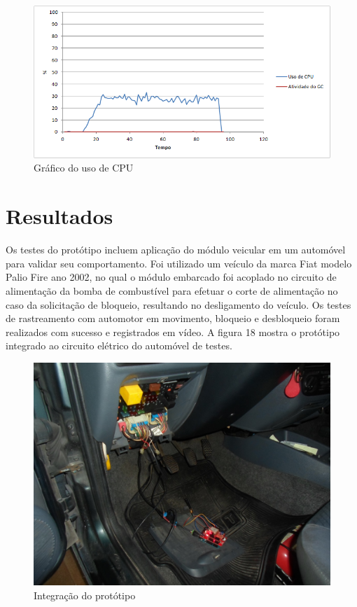 \begin{figure}[!htb]
	\centering
	\includegraphics[width=15.00cm\textwidth]{figures/teste_cpu.png}
	\caption{Gráfico do uso de CPU}
	\label{Figura 17}
\end{figure}

\section{Resultados}

Os testes do protótipo incluem aplicação do módulo veicular em um automóvel para validar seu comportamento. Foi utilizado um veículo da marca Fiat modelo Palio Fire ano 2002, no qual o módulo embarcado foi acoplado no circuito de alimentação da bomba de combustível para efetuar o corte de alimentação no caso da solicitação de bloqueio, resultando no desligamento do veículo. Os testes de rastreamento com automotor em movimento, bloqueio e desbloqueio foram realizados com sucesso e registrados em vídeo. A figura 18 mostra o protótipo integrado ao circuito elétrico do automóvel de testes.

\begin{figure}[!htb]
	\centering
	\includegraphics[width=12.00cm\textwidth]{figures/integracao.jpg}
	\caption{Integração do protótipo}
	\label{Figura 18}
\end{figure}


